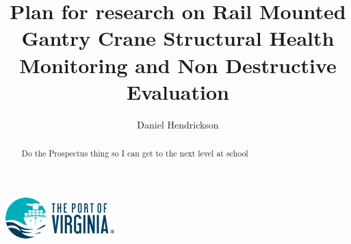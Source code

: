 \documentclass[journal=jacsat,manuscript=article]{achemso}
\author{Daniel Hendrickson}
\affiliation[Port of Virginia]
{Vice President Asset Management, Virginia Port Authority, Norfolk, VA}
\title[Research Prospecutus]
  {Plan for research on Rail Mounted Gantry Crane Structural Health Monitoring and Non Destructive Evaluation}
\begin{document}
\begin{tocentry}

\includegraphics{Figures/PortLogo}

\end{tocentry}

\begin{abstract}
 
Do the Prospectus thing so I can get to the next level at school
  

\end{abstract}
\pagebreak



\pagebreak
\end{document}
